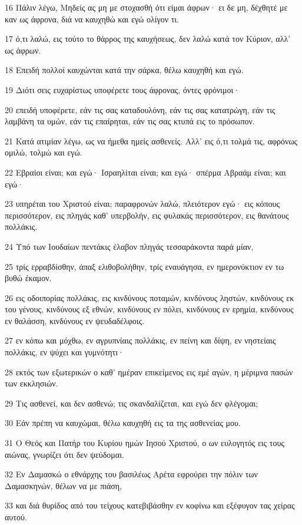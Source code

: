 \par 16 Πάλιν λέγω, Μηδείς ας μη με στοχασθή ότι είμαι άφρων· ει δε μη, δέχθητέ με καν ως άφρονα, διά να καυχηθώ και εγώ ολίγον τι.
\par 17 ό,τι λαλώ, εις τούτο το θάρρος της καυχήσεως, δεν λαλώ κατά τον Κύριον, αλλ' ως άφρων.
\par 18 Επειδή πολλοί καυχώνται κατά την σάρκα, θέλω καυχηθή και εγώ.
\par 19 Διότι σεις ευχαρίστως υποφέρετε τους άφρονας, όντες φρόνιμοι·
\par 20 επειδή υποφέρετε, εάν τις σας καταδουλόνη, εάν τις σας κατατρώγη, εάν τις λαμβάνη τα υμών, εάν τις επαίρηται, εάν τις σας κτυπά εις το πρόσωπον.
\par 21 Κατά ατιμίαν λέγω, ως να ήμεθα ημείς ασθενείς. Αλλ' εις ό,τι τολμά τις, αφρόνως ομιλώ, τολμώ και εγώ.
\par 22 Εβραίοι είναι; και εγώ· Ισραηλίται είναι; και εγώ· σπέρμα Αβραάμ είναι; και εγώ·
\par 23 υπηρέται του Χριστού είναι; παραφρονών λαλώ, πλειότερον εγώ· εις κόπους περισσότερον, εις πληγάς καθ' υπερβολήν, εις φυλακάς περισσότερον, εις θανάτους πολλάκις.
\par 24 Υπό των Ιουδαίων πεντάκις έλαβον πληγάς τεσσαράκοντα παρά μίαν,
\par 25 τρίς ερραβδίσθην, άπαξ ελιθοβολήθην, τρίς εναυάγησα, εν ημερονύκτιον εν τω βυθώ έκαμον.
\par 26 εις οδοιπορίας πολλάκις, εις κινδύνους ποταμών, κινδύνους ληστών, κινδύνους εκ του γένους, κινδύνους εξ εθνών, κινδύνους εν πόλει, κινδύνους εν ερημία, κινδύνους εν θαλάσση, κινδύνους εν ψευδαδέλφοις.
\par 27 εν κόπω και μόχθω, εν αγρυπνίαις πολλάκις, εν πείνη και δίψη, εν νηστείαις πολλάκις, εν ψύχει και γυμνότητι·
\par 28 εκτός των εξωτερικών ο καθ' ημέραν επικείμενος εις εμέ αγών, η μέριμνα πασών των εκκλησιών.
\par 29 Τις ασθενεί, και δεν ασθενώ; τις σκανδαλίζεται, και εγώ δεν φλέγομαι;
\par 30 Εάν πρέπη να καυχώμαι, θέλω καυχηθή εις τα της ασθενείας μου.
\par 31 Ο Θεός και Πατήρ του Κυρίου ημών Ιησού Χριστού, ο ων ευλογητός εις τους αιώνας, γνωρίζει ότι δεν ψεύδομαι.
\par 32 Εν Δαμασκώ ο εθνάρχης του βασιλέως Αρέτα εφρούρει την πόλιν των Δαμασκηνών, θέλων να με πιάση,
\par 33 και διά θυρίδος από του τείχους κατεβιβάσθην εν κοφίνω και εξέφυγον τας χείρας αυτού.

